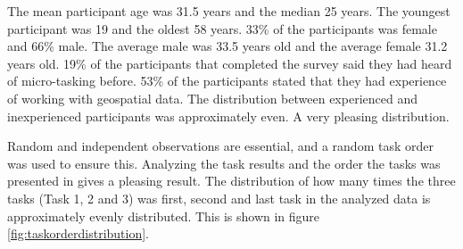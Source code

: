 The mean participant age was 31.5 years and the median 25 years. The youngest participant was 19 and the oldest 58 years. 33\% of the participants was female and 66\% male. The average male was 33.5 years old and the average female 31.2 years old. 19\% of the participants that completed the survey said they had heard of micro-tasking before. 53\% of the participants stated that they had experience of working with geospatial data. The distribution between experienced and inexperienced participants was approximately even. A very pleasing distribution. 

Random and independent observations are essential, and a random task order was used to ensure this. Analyzing the task results and the order the tasks was presented in gives a pleasing result. The distribution of how many times the three tasks (Task 1, 2 and 3) was first, second and last task in the analyzed data is approximately evenly distributed. This is shown in figure \ref{fig:taskorderdistribution}.

